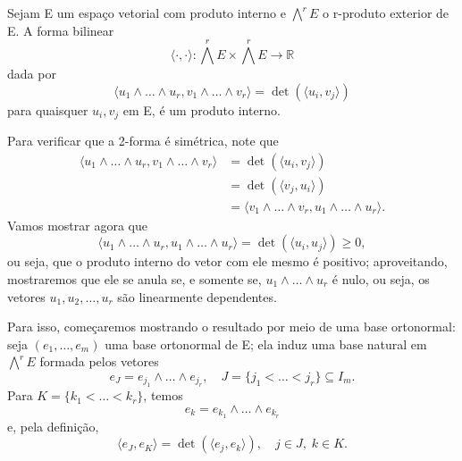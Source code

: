 \documentclass[../differential_forms.tex]{subfiles}
\begin{document}
\begin{theorem*}
	Sejam E um espaço vetorial com produto interno e \(\bigwedge^{r}E\) o r-produto exterior de E. A forma bilinear
	\[
		\langle \cdot , \cdot  \rangle:\bigwedge^{r}E \times \bigwedge^{r}E\rightarrow \mathbb{R}
	\]
	dada por
	\[
		\langle u_1\wedge \dotsc \wedge u_r, v_1\wedge \dotsc \wedge v_r \rangle = \det{(\langle u_{i}, v_{j} \rangle)}
	\]
	para quaisquer \(u_{i}, v_{j}\) em E, é um produto interno.
\end{theorem*}
\begin{proof*}
	Para verificar que a 2-forma é simétrica, note que
	\begin{align*}
		\langle u_1\wedge \dotsc\wedge u_r, v_1\wedge \dotsc \wedge v_r \rangle & = \det{(\langle u_{i}, v_{j} \rangle)}                                      \\
		                                                                        & = \det{(\langle v_{j}, u_{i} \rangle)}                                      \\
		                                                                        & =\langle v_1\wedge \dotsc \wedge v_r, u_1 \wedge \dotsc \wedge u_r \rangle.
	\end{align*}
	Vamos mostrar agora que
	\[
		\langle u_1\wedge \dotsc \wedge u_r, u_1\wedge \dotsc \wedge u_r \rangle = \det{(\langle u_{i}, u_{j} \rangle)} \geq 0,
	\]
	ou seja, que o produto interno do vetor com ele mesmo é positivo; aproveitando, mostraremos que ele se anula se, e somente se, \(u_1\wedge \dotsc \wedge u_r\) é nulo, ou seja, os vetores \(u_1, u_2, \dotsc , u_r\) são linearmente
	dependentes.

	Para isso, começaremos mostrando o resultado por meio de uma base ortonormal: seja \((e_1, \dotsc , e_m)\) uma base ortonormal de E; ela induz uma base natural em \(\bigwedge^{r}E\) formada pelos vetores
	\[
		e_{J} = e_{j_1}\wedge \dotsc \wedge e_{j_r}, \quad J = \{j_1 < \dotsc < j_r\} \subseteq I_{m}.
	\]
	Para \(K = \{k_1 < \dotsc < k_r\}\), temos
	\[
		e_{k} = e_{k_1} \wedge \dotsc \wedge e_{k_r}
	\]
	e, pela definição,
	\[
		\langle e_{J}, e_{K} \rangle = \det{(\langle e_{j}, e_{k} \rangle)},\quad j\in J,\; k\in K.
	\]


\end{proof*}
\end{document}
